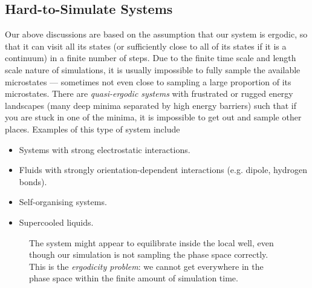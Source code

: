 \documentclass{article}
\theoremstyle{plain}\theoremheaderfont{\normalfont\itshape}\theorembodyfont{\rmfamily}\theoremseparator{.}\newtheorem*{rem}{Remark}\newtheorem*{ex}{Example}\newtheorem*{proof}{Proof}\newtheorem*{altp}{Alternative proof}
\theoremstyle{plain}\theoremheaderfont{\normalfont\bfseries}\theorembodyfont{\rmfamily}\theoremseparator{.}\newtheorem{thm}{Theorem}[section]\newtheorem{lem}[thm]{Lemma}\newtheorem{prop}[thm]{Proposition}\newtheorem*{cor}{Corollary}\newtheorem{defn}[thm]{Definition}\newtheorem{clm}[thm]{Claim}\newtheorem{clminproof}{Claim}\newtheorem{alg}[thm]{Algorithm}\newtheorem{hyp}[thm]{Hypothesis}\newtheorem{law}[thm]{Law}
\theoremstyle{break}\theoremheaderfont{\normalfont\itshape}\theorembodyfont{\rmfamily}\theoremseparator{.\medskip}\newtheorem*{proofskip}{Proof}\newtheorem*{exs}{Examples}\newtheorem*{rems}{Remarks}
\theoremstyle{break}\theoremheaderfont{\normalfont\bfseries}\theorembodyfont{\rmfamily}\theoremseparator{.\medskip}\newtheorem{lemskip}[thm]{Lemma}\newtheorem{defnskip}[thm]{Definition}\newtheorem{propskip}[thm]{Proposition}\newtheorem{thmskip}[thm]{Theorem}
\numberwithin{equation}{section}
\begin{document}
    \subsection{Hard-to-Simulate Systems}
    Our above discussions are based on the assumption that our system is ergodic, so that it can visit all its states (or sufficiently close to all of its states if it is a continuum) in a finite number of steps. Due to the finite time scale and length scale nature of simulations, it is usually impossible to fully sample the available microstates --- sometimes not even close to sampling a large proportion of its microstates. There are \textit{quasi-ergodic systems} with frustrated or rugged energy landscapes (many deep minima separated by high energy barriers) such that if you are stuck in one of the minima, it is impossible to get out and sample other places. Examples of this type of system include
    \begin{itemize}[topsep=0pt]
        \item Systems with strong electrostatic interactions.
        \item Fluids with strongly orientation-dependent interactions (e.g. dipole, hydrogen bonds).
        \item Self-organising systems.
        \item Supercooled liquids.
    \end{itemize}

    \begin{figure}
        \centering
        \caption{The system might appear to equilibrate inside the local well, even though our simulation is not sampling the phase space correctly. This is the \textit{ergodicity problem}: we cannot get everywhere in the phase space within the finite amount of simulation time.}
    \end{figure}
\end{document}
